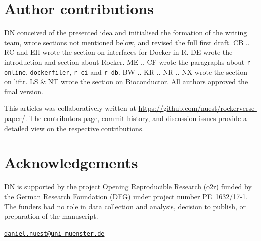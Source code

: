 \hypertarget{author-contributions}{%
\section{Author contributions}\label{author-contributions}}

DN conceived of the presented idea and
\href{https://github.com/nuest/rockerverse-paper/issues/3}{initialised the formation of the writing team},
wrote sections not mentioned below, and revised the full first draft. CB
.. RC and EH wrote the section on interfaces for Docker in R. DE wrote
the introduction and section about Rocker. ME .. CF wrote the paragraphs
about \texttt{r-online}, \texttt{dockerfiler}, \texttt{r-ci} and
\texttt{r-db}. BW .. KR .. NR .. NX wrote the section on liftr. LS \& NT
wrote the section on Bioconductor. All authors approved the final
version.

This articles was collaboratively written at
\href{https://github.com/nuest/rockerverse-paper/}{https://github.com/nuest/rockerverse-paper/}.
The
\href{https://github.com/nuest/rockerverse-paper/graphs/contributors}{contributors page},
\href{https://github.com/nuest/rockerverse-paper/commits/master}{commit history},
and
\href{https://github.com/nuest/rockerverse-paper/issues/}{discussion issues}
provide a detailed view on the respective contributions.

\hypertarget{acknowledgements}{%
\section{Acknowledgements}\label{acknowledgements}}

DN is supported by the project Opening Reproducible Research
(\href{https://www.uni-muenster.de/forschungaz/project/12343}{o2r})
funded by the German Research Foundation (DFG) under project number
\href{https://gepris.dfg.de/gepris/projekt/415851837}{PE~1632/17-1}. The
funders had no role in data collection and analysis, decision to
publish, or preparation of the manuscript.




\address{%
Daniel Nüst\\
University of Münster\\
Institute for Geoinformatics\\ Heisenbergstr. 2\\ 48149 Münster, Germany\\ \\
}
\href{mailto:daniel.nuest@uni-muenster.de}{\nolinkurl{daniel.nuest@uni-muenster.de}}


